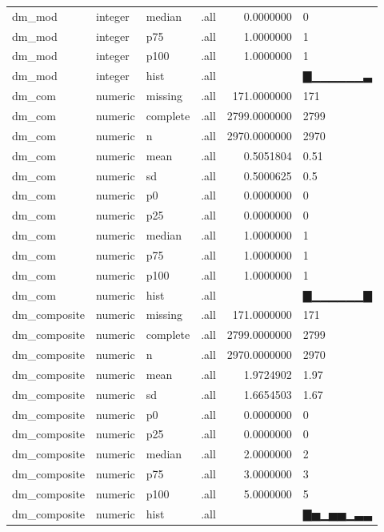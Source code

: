 \documentclass[]{msu-thesis}
\theoremstyle{definition}
\theoremstyle{definition}
\theoremstyle{definition}
\theoremstyle{remark}
\begin{document}
\begin{table}
{\begin{tabular}[t]{llllrl}
dm\_mod & integer & median & .all & 0.0000000 & 0\\
dm\_mod & integer & p75 & .all & 1.0000000 & 1\\
dm\_mod & integer & p100 & .all & 1.0000000 & 1\\
dm\_mod & integer & hist & .all &  & ▇▁▁▁▁▁▁▃\\
dm\_com & numeric & missing & .all & 171.0000000 & 171\\
dm\_com & numeric & complete & .all & 2799.0000000 & 2799\\
dm\_com & numeric & n & .all & 2970.0000000 & 2970\\
dm\_com & numeric & mean & .all & 0.5051804 & 0.51\\
dm\_com & numeric & sd & .all & 0.5000625 & 0.5\\
dm\_com & numeric & p0 & .all & 0.0000000 & 0\\
dm\_com & numeric & p25 & .all & 0.0000000 & 0\\
dm\_com & numeric & median & .all & 1.0000000 & 1\\
dm\_com & numeric & p75 & .all & 1.0000000 & 1\\
dm\_com & numeric & p100 & .all & 1.0000000 & 1\\
dm\_com & numeric & hist & .all &  & ▇▁▁▁▁▁▁▇\\
dm\_composite & numeric & missing & .all & 171.0000000 & 171\\
dm\_composite & numeric & complete & .all & 2799.0000000 & 2799\\
dm\_composite & numeric & n & .all & 2970.0000000 & 2970\\
dm\_composite & numeric & mean & .all & 1.9724902 & 1.97\\
dm\_composite & numeric & sd & .all & 1.6654503 & 1.67\\
dm\_composite & numeric & p0 & .all & 0.0000000 & 0\\
dm\_composite & numeric & p25 & .all & 0.0000000 & 0\\
dm\_composite & numeric & median & .all & 2.0000000 & 2\\
dm\_composite & numeric & p75 & .all & 3.0000000 & 3\\
dm\_composite & numeric & p100 & .all & 5.0000000 & 5\\
dm\_composite & numeric & hist & .all &  & ▇▅▁▅▅▁▃▃\\
\bottomrule
\end{tabular}}
\end{table}
\end{document}
